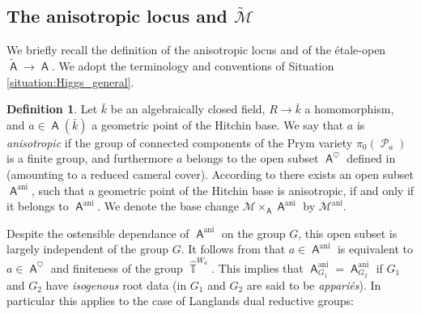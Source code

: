 \documentclass{article}
\DeclareMathOperator{\A}{\mathsf{A}}
\DeclareMathOperator{\ani}{ani}
\DeclareMathOperator{\Tb}{\mathbb{T}}
\newcommand{\Mc}{\mathcal{M}}
\DeclareMathOperator{\Pc}{\mathcal{P}}
\DeclareMathOperator{\AJ}{\mathsf{AJ}}
\theoremstyle{definition}
\newtheorem{definition}{Definition}[section]
\theoremstyle{plain}
\newtheorem{lemma}[definition]{Lemma}
\begin{document}
%

\subsection{The anisotropic locus and $\widetilde{\Mc}$}\label{sub:ani}

We briefly recall the definition of the anisotropic locus and of the \'etale-open $\widetilde{\A} \to \A$. We adopt the terminology and conventions of Situation \ref{situation:Higgs_general}.

\begin{definition}\label{defi:ani}
Let $\bar{k}$ be an algebraically closed field, $R \to \bar{k}$ a homomorphism, and $a \in \A(\bar{k})$ a geometric point of the Hitchin base. We say that $a$ is \emph{anisotropic} if the group of connected components of the Prym variety $\pi_0(\Pc_a)$ is a finite group, and furthermore $a$ belongs to the open subset $\A^{\heartsuit}$ defined in \cite[4.5]{MR2653248} (amounting to a reduced cameral cover). According to \cite[6.1]{MR2653248} there exists an open subset $\A^{\ani}$, such that a geometric point of the Hitchin base is anisotropic, if and only if it belongs to $\A^{\ani}$. We denote the base change $\Mc \times_{\A} \A^{\ani}$ by $\Mc^{\ani}$. 
\end{definition}

Despite the ostensible dependance of $\A^{\ani}$ on the group $G$, this open subset is largely independent of the group $G$. It follows from \cite[4.10.5]{MR2653248} that $a \in \A^{\ani}$ is equivalent to $a \in \A^{\heartsuit}$ and finiteness of the group $\widehat{\Tb}^{W_a}$. This implies that $\A^{\ani}_{G_1} = \A^{\ani}_{G_2}$ if $G_1$ and $G_2$ have \emph{isogenous} root data (in \cite[1.12.4]{MR2653248} $G_1$ and $G_2$ are said to be \emph{appari\'es}). In particular this applies to the case of Langlands dual reductive groups:
\end{document}
